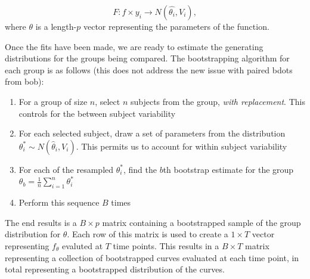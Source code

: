 \documentclass{article}
\begin{document}
\begin{equation}
F: f \times y_i \rightarrow N(\hat{\theta_i}, V_{i}),
\end{equation}
where $\theta$ is a length-$p$ vector representing the parameters of the function.

Once the fits have been made, we are ready to estimate the generating distributions for the groups being compared. The bootstrapping algorithm for each group is as follows (this does not address the new issue with paired bdots from bob):


\begin{enumerate}
\item For a group of size $n$, select $n$ subjects from the group, \textit{with replacement}. This controls for the between subject variability
\item For each selected subject, draw a set of parameters from the distribution $\theta_{i}^* \sim N(\hat{\theta}_i, V_i)$. This permits us to account for within subject variability
\item For each of the resampled $\theta_i^*$, find the $b$th bootstrap estimate for the group $\theta_b = \frac1n \sum_{i=1}^n \theta_i^*$
\item Perform this sequence $B$ times
\end{enumerate}


The end results is a $B \times p$ matrix containing a bootstrapped sample of the group distribution for $\theta$. Each row of this matrix is used to create a $1 \times T$ vector representing $f_{\theta}$ evaluted at $T$ time points. This results in a $B \times T$ matrix representing a collection of bootstrapped curves evaluated at each time point, in total representing a bootstrapped distribution of the curves.


\end{document}
